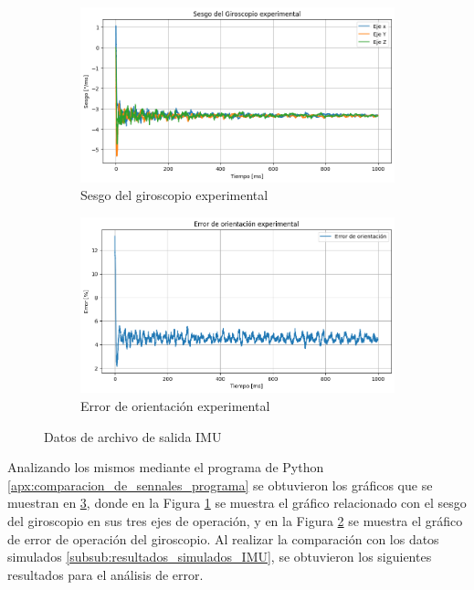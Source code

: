 \begin{figure}[htbp]
    \centering
    \begin{subfigure}[b]{0.35\textwidth}
        \centering
        \includegraphics[width=\textwidth]{fig/Capitulo5/Caso_de_estudio_IMU/data/experimental/sesgo_experimental.png}
        \caption{Sesgo del giroscopio experimental}
        \label{fig:imu_sesgo_exp}
    \end{subfigure}
    \hfill
    \begin{subfigure}[b]{0.45\textwidth}
        \centering
        \includegraphics[width=\textwidth]{fig/Capitulo5/Caso_de_estudio_IMU/data/experimental/error_de_orientacion.png}
        \caption{Error de orientación experimental}
        \label{fig:out_files_IMU_eo_exp}
    \end{subfigure}
    \caption{Datos de archivo de salida IMU}
    \label{fig:IMU_ZEDBOARD_exp}
\end{figure}

Analizando los mismos mediante el programa de Python \ref{apx:comparacion_de_sennales_programa} se obtuvieron los gráficos que se muestran en \ref{fig:IMU_ZEDBOARD_exp}, donde en la Figura \ref{fig:imu_sesgo_exp} se muestra el gráfico relacionado con el sesgo del giroscopio en sus tres ejes de operación, y en la Figura \ref{fig:out_files_IMU_eo_exp} se muestra el gráfico de error de operación del giroscopio. Al realizar la comparación con los datos simulados \ref{subsub:resultados_simulados_IMU}, se obtuvieron los siguientes resultados para el análisis de error.

